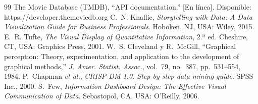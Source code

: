 \documentclass[conference,a4paper]{IEEEtran}
\begin{document}
\begin{thebibliography}{99}
\footnotesize
{} The Movie Database (TMDB), ``API documentation.'' [En línea]. Disponible: https://developer.themoviedb.org
 C.~N. Knaflic, \emph{Storytelling with Data: A Data Visualization Guide for Business Professionals}. Hoboken, NJ, USA: Wiley, 2015.
 E.~R. Tufte, \emph{The Visual Display of Quantitative Information}, 2.ª ed. Cheshire, CT, USA: Graphics Press, 2001.
 W.~S. Cleveland y R.~McGill, ``Graphical perception: Theory, experimentation, and application to the development of graphical methods,'' \emph{J. Amer. Statist. Assoc.}, vol.~79, no.~387, pp.~531--554, 1984.
 P.~Chapman \emph{et al.}, \emph{CRISP-DM 1.0: Step-by-step data mining guide}. SPSS Inc., 2000.
 S.~Few, \emph{Information Dashboard Design: The Effective Visual Communication of Data}. Sebastopol, CA, USA: O'Reilly, 2006.
\end{thebibliography}
\end{document}
